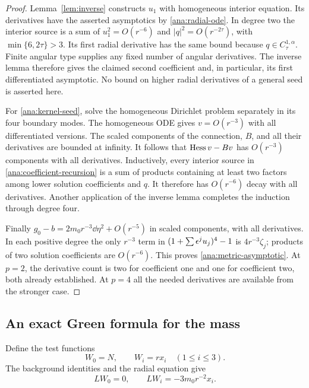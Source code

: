 \begin{proof}
Lemma~\ref{lem:inverse} constructs $u_1$ with homogeneous interior
equation.  Its derivatives have the asserted asymptotics by
\eqref{ana:radial-ode}.  In degree two the interior source is a sum
of $u_1^2=O(r^{-6})$ and $|q|^2=O(r^{-2\tau})$, with
$\min\{6,2\tau\}>3$.  Its first radial derivative has the same
bound because $q\in C^{1,\alpha}_\tau$.  Finite angular type supplies
any fixed number of angular derivatives.  The inverse lemma therefore
gives the claimed second coefficient and, in particular, its first
differentiated asymptotic.  No bound on higher radial derivatives of a
general seed is asserted here.

For \eqref{ana:kernel-seed}, solve the homogeneous Dirichlet problem
separately in its four boundary modes.  The homogeneous ODE gives
$v=O(r^{-3})$ with all differentiated versions.  The scaled components
of the connection, $B$, and all their derivatives are bounded at
infinity.  It follows that $\operatorname{Hess} v-Bv$ has $O(r^{-3})$ components
with all derivatives.  Inductively, every interior source in
\eqref{ana:coefficient-recursion} is a sum of products containing at
least two factors among lower solution coefficients and $q$.
It therefore has $O(r^{-6})$ decay with all derivatives.  Another
application of the inverse lemma completes the induction through
degree four.

Finally $g_0-b=2m_0r^{-3}\dd\eta^2+O(r^{-5})$ in scaled components,
with all derivatives.  In each positive degree the only $r^{-3}$
term in $(1+\sum\epsilon^ju_j)^4-1$ is $4r^{-3}\zeta_j$;
products of two solution coefficients are $O(r^{-6})$.
This proves \eqref{ana:metric-asymptotic}.  At $p=2$, the derivative
count is two for coefficient one and one for coefficient two, both
already established.  At $p=4$ all the needed derivatives are
available from the stronger case.
\end{proof}

\subsection{An exact Green formula for the mass}

Define the test functions
\begin{equation}
 W_0=N,\qquad W_i=rx_i\quad(1\leq i\leq3).
 \label{ana:tests}
\end{equation}
The background identities and the radial equation give
\begin{equation}
 LW_0=0,\qquad LW_i=-3m_0r^{-2}x_i.
 \label{ana:tests-equations}
\end{equation}

